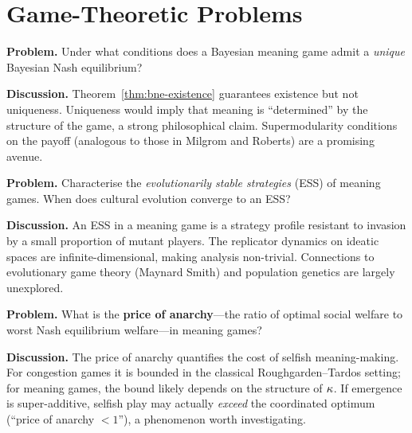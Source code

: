 \section{Game-Theoretic Problems}
\label{sec:open-games}

\begin{game}
\label{op:bne-unique}
\textbf{Problem.}  Under what conditions does a Bayesian meaning
game admit a \emph{unique} Bayesian Nash equilibrium?

\textbf{Discussion.}  Theorem~\ref{thm:bne-existence} guarantees
existence but not uniqueness.  Uniqueness would imply that meaning
is ``determined'' by the structure of the game, a strong
philosophical claim.  Supermodularity conditions on the payoff
(analogous to those in Milgrom and Roberts)
are a promising avenue.
\end{game}

\begin{game}
\label{op:ess}
\textbf{Problem.}  Characterise the \emph{evolutionarily stable
strategies} (ESS) of meaning games.  When does cultural evolution
converge to an ESS?

\textbf{Discussion.}  An ESS in a meaning game is a strategy
profile resistant to invasion by a small proportion of mutant
players.  The replicator dynamics on ideatic spaces are
infinite-dimensional, making analysis non-trivial.  Connections
to evolutionary game theory (Maynard Smith)
and population genetics are largely unexplored.
\end{game}

\begin{game}
\label{op:poa}
\textbf{Problem.}  What is the \textbf{price of anarchy}---the
ratio of optimal social welfare to worst Nash equilibrium welfare---in meaning games?

\textbf{Discussion.}  The price of anarchy quantifies the cost of
selfish meaning-making.  For congestion games it is bounded in the
classical Roughgarden--Tardos setting; for meaning games, the bound likely
depends on the structure of $\kappa$.  If emergence is
super-additive, selfish play may actually \emph{exceed} the
coordinated optimum (``price of anarchy $< 1$''), a phenomenon
worth investigating.
\end{game}

